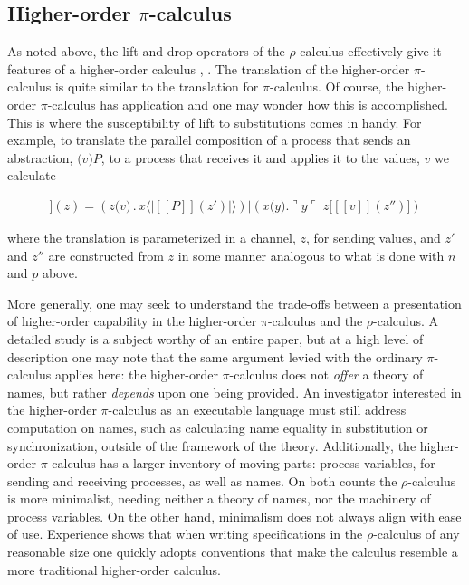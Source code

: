 \documentclass[]{entcs}
\newcommand{\ldb}{[\![}
\newcommand{\rdb}{]\!]}
\newcommand{\lliftb}{\langle\!|}
\newcommand{\rliftb}{|\!\rangle}
\newcommand{\lpquote}{\ulcorner}
\newcommand{\rpquote}{\urcorner}
\newcommand{\id}[1]{\texttt{#1}}
\newcommand{\juxtap}{\mathbin{\id{|}}}
\newcommand{\concat}{\mathbin{.}}
\newcommand{\binpar}[2]{#1 \juxtap #2}
\newcommand{\outputp}[2]{#1 \id{[} #2 \id{]}}
\newcommand{\prefix}[3]{#1 \id{(} #2 \id{)} \concat #3}
\newcommand{\lift}[2]{#1 \lliftb #2 \rliftb}
\newcommand{\dropn}[1]{\rpquote #1 \lpquote}
\newcommand{\applyp}[2]{#1 \langle #2 \rangle}
\newcommand{\absp}[2]{\id{(} #1 \id{)} #2}
\newcommand{\meaningof}[1]{\ldb #1 \rdb}
\newcommand{\pic}{$\pi$-calculus}
\newcommand{\rhoc}{$\rho$-calculus}
\begin{document}
\subsection{Higher-order {\pic}}

As noted above, the lift and drop operators of the {\rhoc} effectively
give it features of a higher-order calculus \cite{hop},
\cite{facile}. The translation of the higher-order {\pic} is quite
similar to the translation for {\pic}. Of course, the higher-order
{\pic} has application and one may wonder how this is
accomplished. This is where the susceptibility of lift to
substitutions comes in handy. For example, to translate the parallel
composition of a process that sends an abstraction, $\absp{v}{P}$, to
a process that receives it and applies it to the values, $v$ we
calculate

\begin{eqnarray}
	\meaningof{\binpar{\outputp{x}{\absp{v}{P}}}{(\prefix{x}{Y}{\applyp{Y}{v}})}}(z)
		= 
	\binpar{(\prefix{z}{v}{\lift{x}{\meaningof{P}(z')}})}
	       {(\binpar{\prefix{x}{y}{\dropn{y}}}{\outputp{z}{\meaningof{v}(z'')}})} \nonumber
\end{eqnarray}

where the translation is parameterized in a channel, $z$, for sending
values, and $z'$ and $z''$ are constructed from $z$ in some manner
analogous to what is done with $n$ and $p$ above.

More generally, one may seek to understand the trade-offs between a
presentation of higher-order capability in the higher-order {\pic} and
the {\rhoc}. A detailed study is a subject worthy of an entire paper,
but at a high level of description one may note that the same argument
levied with the ordinary {\pic} applies here: the higher-order {\pic}
does not \emph{offer} a theory of names, but rather \emph{depends}
upon one being provided. An investigator interested in the
higher-order {\pic} as an executable language must still address
computation on names, such as calculating name equality in
substitution or synchronization, outside of the framework of the
theory. Additionally, the higher-order {\pic} has a larger inventory
of moving parts: process variables, for sending and receiving
processes, as well as names. On both counts the {\rhoc} is more
minimalist, needing neither a theory of names, nor the machinery of
process variables. On the other hand, minimalism does not always align
with ease of use. Experience shows that when writing specifications in
the {\rhoc} of any reasonable size one quickly adopts conventions that
make the calculus resemble a more traditional higher-order calculus.
\end{document}

